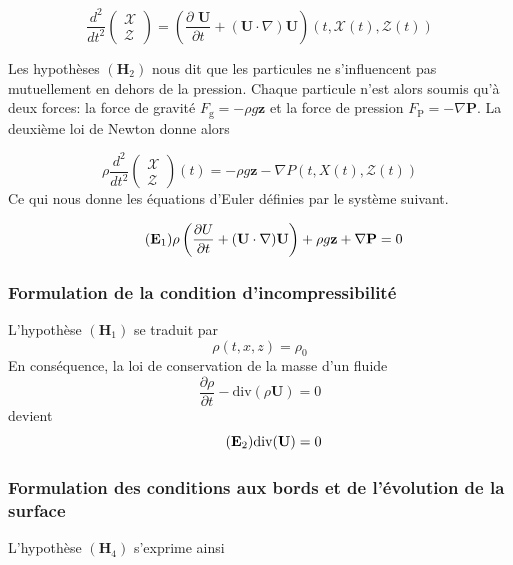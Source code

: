 \documentclass[12pt,a4paper]{article}
\numberwithin{equation}{section}
\begin{document}
$$
\frac{d^2 }{dt^2}\left(\begin{array}{l}
         \mathcal{X}\\
         \mathcal{Z}
\end{array}\right)= \left(\frac{\partial\textbf{ U}}{\partial t}+ (\textbf{U}\cdot \nabla ) \textbf{U}\right)(t,\mathcal{X}(t),\mathcal{Z}(t)) 
$$

Les hypothèses $(\textbf{H}_2)$ nous dit que les particules ne s'influencent pas mutuellement en dehors de la pression. Chaque particule n'est alors soumis qu'à deux forces: la force de gravité $ F_\text{g} = -\rho g\textbf{z}$ et la force de pression $F_\text{P} = - \nabla\textbf{P}$. La deuxième loi de Newton donne alors

$$
\rho\frac{d^2 }{dt^2}\left(\begin{array}{l}
         \mathcal{X}\\
         \mathcal{Z}
\end{array}\right)(t) = - \rho g \textbf{z} -\nabla P(t,X(t),\mathcal{Z}(t))
$$
Ce qui nous donne les équations d'Euler définies par le système suivant.

\begin{equation} 
\tag{$\textbf{E}_1$} \label{eq_E1}
\rho \left( \frac{\partial U}{\partial t} + (\textbf{U}\cdot \nabla ) \textbf{U} \right) + \rho g\textbf{z} + \nabla \textbf{P} = 0
\end{equation}


\subsubsection{Formulation de la condition d'incompressibilité}
L'hypothèse $(\textbf{H}_1)$ se traduit par
$$\rho(t,x,z) = \rho_0$$
En conséquence, la loi de conservation de la masse d'un fluide
\begin{equation} \label{mass_conservation}
    \frac{\partial \rho}{\partial t} - \text{div}(\rho\textbf{U}) = 0
\end{equation}
devient
\begin{equation} \tag{$\textbf{E}_2$} \label{divergence_free}
    \text{div} (\textbf{U}) = 0
\end{equation}

\subsubsection{Formulation des conditions aux bords et de l'évolution de la surface}

L'hypothèse $(\textbf{H}_4)$ s'exprime ainsi
\end{document}
